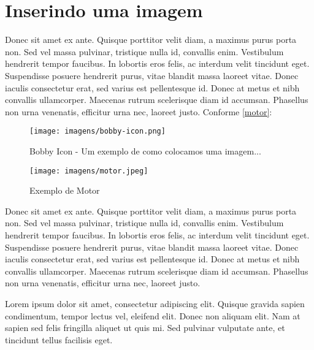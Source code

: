 
\section{Inserindo uma imagem}

Donec sit amet ex ante. Quisque porttitor velit diam, a maximus purus porta non. Sed vel massa pulvinar, tristique nulla id, convallis enim. Vestibulum hendrerit tempor faucibus. In lobortis eros felis, ac interdum velit tincidunt eget. Suspendisse posuere hendrerit purus, vitae blandit massa laoreet vitae. Donec iaculis consectetur erat, sed varius est pellentesque id. Donec at metus et nibh convallis ullamcorper. Maecenas rutrum scelerisque diam id accumsan. Phasellus non urna venenatis, efficitur urna nec, laoreet justo. Conforme \autoref{motor}:

\begin{figure}[htbp]
    \caption{Bobby Icon - Um exemplo de como colocamos uma imagem...}
	\centering
		\texttt{[image: imagens/bobby-icon.png]}
	\label{fig:image1}
\end{figure}

\begin{figure}[htbp]
    \caption{Exemplo de Motor}
	\centering
		\texttt{[image: imagens/motor.jpeg]}
	\label{motor}
\end{figure}


Donec sit amet ex ante. Quisque porttitor velit diam, a maximus purus porta non. Sed vel massa pulvinar, tristique nulla id, convallis enim. Vestibulum hendrerit tempor faucibus. In lobortis eros felis, ac interdum velit tincidunt eget. Suspendisse posuere hendrerit purus, vitae blandit massa laoreet vitae. Donec iaculis consectetur erat, sed varius est pellentesque id. Donec at metus et nibh convallis ullamcorper. Maecenas rutrum scelerisque diam id accumsan. Phasellus non urna venenatis, efficitur urna nec, laoreet justo.

Lorem ipsum dolor sit amet, consectetur adipiscing elit. Quisque gravida sapien condimentum, tempor lectus vel, eleifend elit. Donec non aliquam elit. Nam at sapien sed felis fringilla aliquet ut quis mi. Sed pulvinar vulputate ante, et tincidunt tellus facilisis eget.

